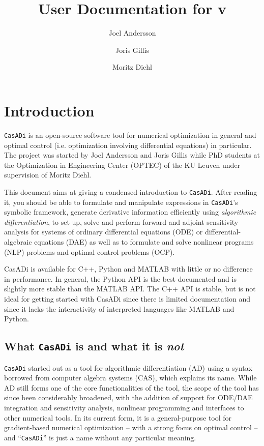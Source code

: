 \documentclass[a4paper,12pt]{book}
\author{Joel Andersson \and Joris Gillis \and Moritz Diehl}
\title{User Documentation for \CasADi v\currentversion}
\newcommand{\CasADi}{\texttt{CasADi}\xspace}
\begin{document}
\titlepage
\maketitle
\begin{latexonly}
\tableofcontents
\end{latexonly}
\clearpage

\chapter{Introduction}
\CasADi is an open-source software tool for numerical optimization in general and optimal control
(i.e. optimization involving differential equations) in particular. The project was started by
Joel Andersson and Joris Gillis while PhD students at the Optimization in Engineering Center
(OPTEC) of the KU Leuven under supervision of Moritz Diehl.

This document aims at giving a condensed introduction to \CasADi. After reading it, you should be able to formulate and manipulate expressions in \CasADi's symbolic framework, generate derivative information efficiently using \emph{algorithmic differentiation}, to set up, solve and perform forward and adjoint sensitivity analysis for systems of ordinary differential equations (ODE) or differential-algebraic equations (DAE) as well as to formulate and solve nonlinear programs (NLP) problems and optimal control problems (OCP).

CasADi is available for C++, Python and MATLAB with little or no difference in performance. In general, the Python API is the best documented and is slightly more stable than the MATLAB API. The C++ API is stable, but is not ideal for getting started with CasADi since there is limited documentation and since it lacks the interactivity of interpreted languages like MATLAB and Python.

\section{What \CasADi is and what it is \emph{not}}
\CasADi started out as a tool for algorithmic differentiation (AD) using a syntax borrowed from computer algebra systems (CAS), which explains its name. While AD still forms one of the core functionalities of the tool, the scope of the tool has since been considerably broadened, with the addition of support for ODE/DAE integration and sensitivity analysis, nonlinear programming and interfaces to other numerical tools. In its current form, it is a general-purpose tool for gradient-based numerical optimization -- with a strong focus on optimal control -- and ``\CasADi'' is just a name without any particular meaning.
\end{document}
